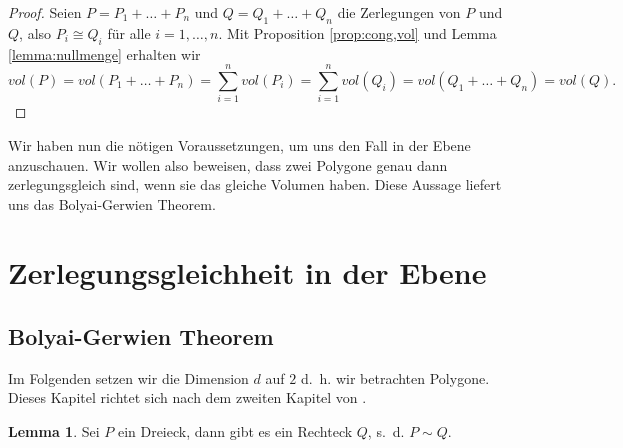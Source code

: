 \documentclass[11pt,titlepage]{article}
\theoremstyle{definition}
\newtheorem{lemma}[theorem]{Lemma}
\theoremstyle{remark}
\begin{document}
	\begin{proof}
		Seien $P=P_1+\ldots+P_n$ und $Q=Q_1+\ldots+Q_n$ die Zerlegungen von $P$ und 
		$Q$, also $P_i\cong Q_i$ für alle $i=1,\ldots,n$. Mit Proposition \ref{prop:cong,vol} und Lemma \ref{lemma:nullmenge} erhalten wir 
		\[vol(P)=vol(P_1+\ldots+P_n)=\sum_{i=1}^n vol(P_i)=\sum_{i=1}^n vol(Q_i)=vol(Q_1+\ldots+Q_n)=vol(Q).\]
	\end{proof}
	
	Wir haben nun die nötigen Voraussetzungen, um uns den Fall in der Ebene 
	anzuschauen. Wir wollen also beweisen, dass zwei Polygone genau 
	dann zerlegungsgleich sind, wenn sie das gleiche Volumen haben. 
	Diese Aussage liefert uns das Bolyai-Gerwien Theorem.

	\newpage
	
	\section{Zerlegungsgleichheit in der Ebene}
	
	\subsection{Bolyai-Gerwien Theorem}
	
	Im Folgenden setzen wir die Dimension $d$ auf $2$ d.~h. wir betrachten Polygone. 
	Dieses Kapitel richtet sich nach dem zweiten Kapitel von \cite{Boltianskii}.
	
	\begin{lemma}
		Sei $P$ ein Dreieck, dann gibt es ein Rechteck $Q$, s.~d. $P\sim Q$. \label{lemma:dreieck,rechteck}
	\end{lemma}
	
\end{document}

